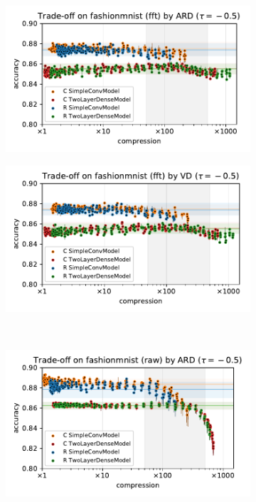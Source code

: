 \documentclass[a4paper,10pt,onecolumn]{article}
\begin{document}
\begin{figure}[b]
\begin{subfigure}[b]{0.5\columnwidth}
    \centering
    \includegraphics[width=\columnwidth]{figure__mnist-like__trade-off/appendix__ARD__fashionmnist__fft__-0.5.pdf}
  \end{subfigure}%
  \begin{subfigure}[b]{0.5\columnwidth}
    \centering
    \includegraphics[width=\columnwidth]{figure__mnist-like__trade-off/appendix__VD__fashionmnist__fft__-0.5.pdf}
  \end{subfigure} \\%
  \begin{subfigure}[b]{0.5\columnwidth}
    \centering
    \includegraphics[width=\columnwidth]{figure__mnist-like__trade-off/appendix__ARD__fashionmnist__raw__-0.5.pdf}

\end{subfigure}
\end{figure}
\end{document}
